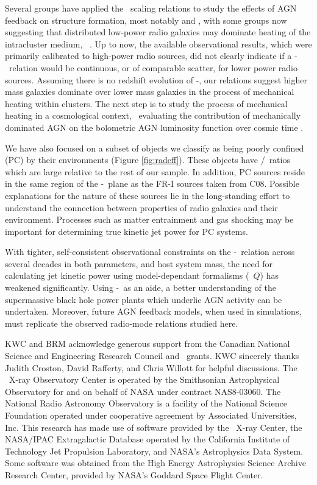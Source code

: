 \documentclass{emulateapj}
\begin{document}
Several groups have applied the \birzan\ scaling relations to study
the effects of AGN feedback on structure formation, most notably
\citet{best07} and \citet{2007MNRAS.379..260M}, with some groups now
suggesting that distributed low-power radio galaxies may dominate
heating of the intracluster medium,
\eg\ \citet{2009arXiv0908.3158H}. Up to now, the available
observational results, which were primarily calibrated to high-power
radio sources, did not clearly indicate if a \pjet-\prad\ relation
would be continuous, or of comparable scatter, for lower power radio
sources. Assuming there is no redshift evolution of \pjet-\prad, our
relations suggest higher mass galaxies dominate over lower mass
galaxies in the process of mechanical heating within clusters. The
next step is to study the process of mechanical heating in a
cosmological context, \eg\ evaluating the contribution of mechanically
dominated AGN on the bolometric AGN luminosity function over cosmic
time \citet{2009MNRAS.395..518C}.

We have also focused on a subset of objects we classify as being
poorly confined (PC) by their environments (Figure
\ref{fig:radeff}). These objects have \pjet/\prad\ ratios which are
large relative to the rest of our sample. In addition, PC sources
reside in the same region of the \pjet-\prad\ plane as the FR-I
sources taken from C08. Possible explanations for the nature of these
sources lie in the long-standing effort to understand the connection
between properties of radio galaxies and their environment. Processes
such as matter entrainment and gas shocking may be important for
determining true kinetic jet power for PC systems.

With tighter, self-consistent observational constraints on the
\pjet-\prad\ relation across several decades in both parameters, and
host system mass, the need for calculating jet kinetic power using
model-dependant formalisms (\ie\ $Q$) has weakened
significantly. Using \pjet-\prad\ as an aide, a better understanding
of the supermassive black hole power plants which underlie AGN
activity can be undertaken. Moreover, future AGN feedback models, when
used in simulations, must replicate the observed radio-mode relations
studied here.

\acknowledgements

KWC and BRM acknowledge generous support from the Canadian National
Science and Engineering Research Council and \cxo\ grants. KWC
sincerely thanks Judith Croston, David Rafferty, and Chris Willott for
helpful discussions. The \chandra\ X-ray Observatory Center is
operated by the Smithsonian Astrophysical Observatory for and on
behalf of NASA under contract NAS8-03060. The National Radio Astronomy
Observatory is a facility of the National Science Foundation operated
under cooperative agreement by Associated Universities, Inc. This
research has made use of software provided by the \chandra\ X-ray
Center, the NASA/IPAC Extragalactic Database operated by the
California Institute of Technology Jet Propulsion Laboratory, and
NASA's Astrophysics Data System. Some software was obtained from the
High Energy Astrophysics Science Archive Research Center, provided by
NASA's Goddard Space Flight Center.
\end{document}
